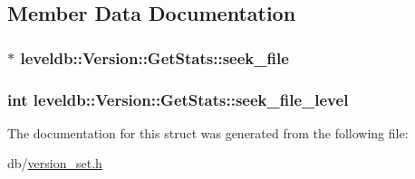 \subsection{Member Data Documentation}
\hypertarget{structleveldb_1_1_version_1_1_get_stats_a8c677e9a2d5bc48a5bcc40e07dd2cca7}{}
\subsubsection[{seek\+\_\+file}]{$\ast$ leveldb\+::\+Version\+::\+Get\+Stats\+::seek\+\_\+file}\label{structleveldb_1_1_version_1_1_get_stats_a8c677e9a2d5bc48a5bcc40e07dd2cca7}
\hypertarget{structleveldb_1_1_version_1_1_get_stats_a6cd952d5850faf00c7d45f79973a76d4}{}
\subsubsection[{seek\+\_\+file\+\_\+level}]{\setlength{\rightskip}{0pt plus 5cm}int leveldb\+::\+Version\+::\+Get\+Stats\+::seek\+\_\+file\+\_\+level}\label{structleveldb_1_1_version_1_1_get_stats_a6cd952d5850faf00c7d45f79973a76d4}


The documentation for this struct was generated from the following file\+:\begin{DoxyCompactItemize}
\item 
db/\hyperlink{version__set_8h}{version\+\_\+set.\+h}\end{DoxyCompactItemize}
